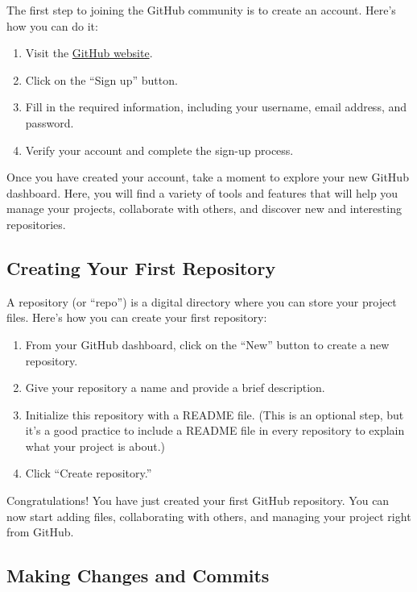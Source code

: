 \documentclass[a4paper,12pt]{book}
\begin{document}
The first step to joining the GitHub community is to create an account. Here’s how you can do it:

\begin{enumerate}
    \item Visit the \href{https://github.com/}{GitHub website}.
    \item Click on the “Sign up” button.
    \item Fill in the required information, including your username, email address, and password.
    \item Verify your account and complete the sign-up process.
\end{enumerate}

Once you have created your account, take a moment to explore your new GitHub dashboard. Here, you will find a variety of tools and features that will help you manage your projects, collaborate with others, and discover new and interesting repositories.

\subsection*{Creating Your First Repository}

A repository (or “repo”) is a digital directory where you can store your project files. Here’s how you can create your first repository:

\begin{enumerate}
    \item From your GitHub dashboard, click on the “New” button to create a new repository.
    \item Give your repository a name and provide a brief description.
    \item Initialize this repository with a README file. (This is an optional step, but it’s a good practice to include a README file in every repository to explain what your project is about.)
    \item Click “Create repository.”
\end{enumerate}

Congratulations! You have just created your first GitHub repository. You can now start adding files, collaborating with others, and managing your project right from GitHub.

\subsection*{Making Changes and Commits}
\end{document}
